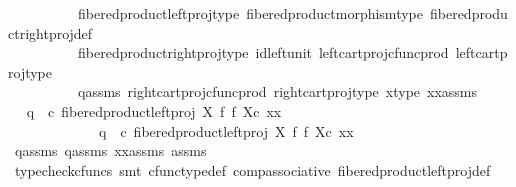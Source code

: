 \begin{isabellebody}
\ \ \ \ \ \ \ \ \ \ fibered{\isacharunderscore}{\kern0pt}product{\isacharunderscore}{\kern0pt}left{\isacharunderscore}{\kern0pt}proj{\isacharunderscore}{\kern0pt}type\ fibered{\isacharunderscore}{\kern0pt}product{\isacharunderscore}{\kern0pt}morphism{\isacharunderscore}{\kern0pt}type\ fibered{\isacharunderscore}{\kern0pt}product{\isacharunderscore}{\kern0pt}right{\isacharunderscore}{\kern0pt}proj{\isacharunderscore}{\kern0pt}def\isanewline
\ \ \ \ \ \ \ \ \ \ fibered{\isacharunderscore}{\kern0pt}product{\isacharunderscore}{\kern0pt}right{\isacharunderscore}{\kern0pt}proj{\isacharunderscore}{\kern0pt}type\ id{\isacharunderscore}{\kern0pt}left{\isacharunderscore}{\kern0pt}unit{}\ left{\isacharunderscore}{\kern0pt}cart{\isacharunderscore}{\kern0pt}proj{\isacharunderscore}{\kern0pt}cfunc{\isacharunderscore}{\kern0pt}prod\ left{\isacharunderscore}{\kern0pt}cart{\isacharunderscore}{\kern0pt}proj{\isacharunderscore}{\kern0pt}type\isanewline
\ \ \ \ \ \ \ \ \ \ q{}{\isacharunderscore}{\kern0pt}assms\ right{\isacharunderscore}{\kern0pt}cart{\isacharunderscore}{\kern0pt}proj{\isacharunderscore}{\kern0pt}cfunc{\isacharunderscore}{\kern0pt}prod\ right{\isacharunderscore}{\kern0pt}cart{\isacharunderscore}{\kern0pt}proj{\isacharunderscore}{\kern0pt}type\ x{\isacharunderscore}{\kern0pt}type\ xx{\isacharunderscore}{\kern0pt}assms{\isacharparenright}{\kern0pt}\isanewline
\ \ \ \ \isamarkupfalse%
\ \isamarkupfalse%
\ {\isachardoublequoteopen}q{}\ \ {\isasymcirc}\isactrlsub c\ {\isacharparenleft}{\kern0pt}{\isacharparenleft}{\kern0pt}fibered{\isacharunderscore}{\kern0pt}product{\isacharunderscore}{\kern0pt}left{\isacharunderscore}{\kern0pt}proj\ X\ f\ f\ X{\isacharparenright}{\kern0pt}{\isasymcirc}\isactrlsub c\ xx{\isacharparenright}{\kern0pt}\ {\isacharequal}{\kern0pt}\ \isanewline
\ \ \ \ \ \ \ \ \ \ \ \ \ q{}\ \ {\isasymcirc}\isactrlsub c\ {\isacharparenleft}{\kern0pt}{\isacharparenleft}{\kern0pt}fibered{\isacharunderscore}{\kern0pt}product{\isacharunderscore}{\kern0pt}left{\isacharunderscore}{\kern0pt}proj\ X\ f\ f\ X{\isacharparenright}{\kern0pt}{\isasymcirc}\isactrlsub c\ xx{\isacharparenright}{\kern0pt}{\isachardoublequoteclose}\isanewline
\ \ \ \ \ \ \isamarkupfalse%
\ q{}{\isacharunderscore}{\kern0pt}assms\ q{}{\isacharunderscore}{\kern0pt}assms\ xx{\isacharunderscore}{\kern0pt}assms\ assms\ \isanewline
\ \ \ \ \ \ \isamarkupfalse%
\ {\isacharparenleft}{\kern0pt}typecheck{\isacharunderscore}{\kern0pt}cfuncs{\isacharcomma}{\kern0pt}\ smt\ cfunc{\isacharunderscore}{\kern0pt}type{\isacharunderscore}{\kern0pt}def\ comp{\isacharunderscore}{\kern0pt}associative{}\ fibered{\isacharunderscore}{\kern0pt}product{\isacharunderscore}{\kern0pt}left{\isacharunderscore}{\kern0pt}proj{\isacharunderscore}{\kern0pt}def\isanewline

\end{isabellebody}
